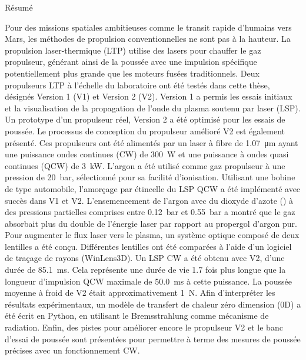 
\begin{plainchp}{Résumé}

    Pour des missions spatiales ambitieuses comme le transit rapide d'humains vers Mars, les méthodes de propulsion conventionnelles ne sont pas à la hauteur. La propulsion laser-thermique (LTP) utilise des lasers pour chauffer le gaz propulseur, générant ainsi de la poussée avec une impulsion spécifique potentiellement plus grande que les moteurs fusées traditionnels. Deux propulseurs LTP à l'échelle du laboratoire ont été testés dans cette thèse, désignés Version 1 (V1) et Version 2 (V2). Version 1 a permis les essais initiaux et la visualisation de la propagation de l'onde du plasma soutenu par laser (LSP). Un prototype d'un propulseur réel, Version 2 a été optimisé pour les essais de poussée. Le processus de conception du propulseur amélioré V2 est également présenté. Ces propulseurs ont été alimentés par un laser à fibre de \qty{1.07}{μm} ayant une puissance ondes continues (CW) de \qty{300}{W} et une puissance à ondes quasi continues (QCW) de \qty{3}{kW}. L'argon a été utilisé comme gaz propulseur à une pression de \qty{20}{bar}, sélectionné pour sa facilité d'ionisation. Utilisant une bobine de type automobile, l'amorçage par étincelle du LSP QCW a été implémenté avec succès dans V1 et V2. L'ensemencement de l'argon avec du dioxyde d'azote () à des pressions partielles comprises entre 0.12~bar et 0.55~bar a montré que le gaz absorbait plus du double de l'énergie laser par rapport au propergol d'argon pur. Pour augmenter le flux laser vers le plasma, un système optique composé de deux lentilles a été conçu. Différentes lentilles ont été comparées à l'aide d'un logiciel de traçage de rayons (WinLens3D). Un LSP CW a été obtenu avec V2, d'une durée de \qty{85.1}{ms}. Cela représente une durée de vie 1.7 fois plus longue que la longueur d'impulsion QCW maximale de \qty{50.0}{ms} à cette puissance. La poussée moyenne à froid de V2 était approximativement \qty{1}{N}. Afin d'interpréter les résultats expérimentaux, un modèle de transfert de chaleur zéro dimension (0D) a été écrit en Python, en utilisant le Bremsstrahlung comme mécanisme de radiation. Enfin, des pistes pour améliorer encore le propulseur V2 et le banc d'essai de poussée sont présentées pour permettre à terme des mesures de poussée précises avec un fonctionnement CW.
    
\end{plainchp}
